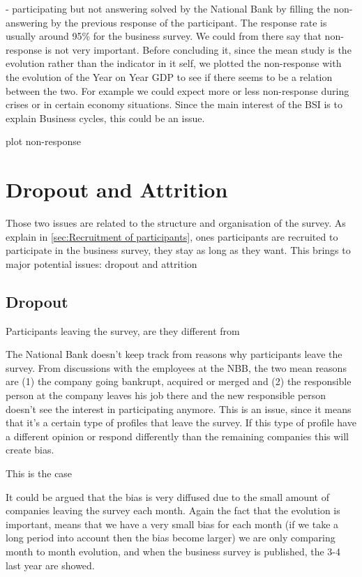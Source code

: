 \documentclass[12pt,a4paper,oneside]{book}
\begin{document}
- participating but not answering 
 solved by the National Bank by filling the non-answering by the previous response of the participant. 
The response rate is usually around 95\% for the business survey. We could from there say that non-response is not very important. 
Before concluding it, since the mean study is the evolution rather than the indicator in it self, we plotted the non-response with the evolution of the Year on Year GDP to see if there seems to be a relation between the two. For example we could expect more or less non-response during crises or in certain economy situations. Since the main interest of the BSI is to explain Business cycles,
this could be an issue.

plot non-response



\section{Dropout and Attrition}

Those two issues are related to the structure and organisation of the survey. As explain in \autoref{sec:Recruitment of participants}, ones participants are recruited to participate in the business survey, they stay as long as they want. This brings to major potential issues: dropout and attrition

\subsection{Dropout}

Participants leaving the survey, are they different from 

The National Bank doesn't keep track from reasons why participants leave the survey. From discussions with the employees at the NBB, the two mean reasons are (1) the company going bankrupt, acquired or merged and (2) the responsible person at the company leaves his job there and the new responsible person doesn't see the interest in participating anymore.
This is an issue, since it means that it's a certain type of profiles that leave the survey. If this type of profile have a different opinion or respond differently than the remaining companies this will create bias. 

This is the case

It could be argued that the bias is very diffused due to the small amount of companies leaving the survey each month. Again the fact that the evolution is important, means that we have a very small bias for each month (if we take a long period into account then the bias become larger) we are only comparing month to month evolution, and when the business survey is published, the 3-4 last year are showed.
\end{document}
